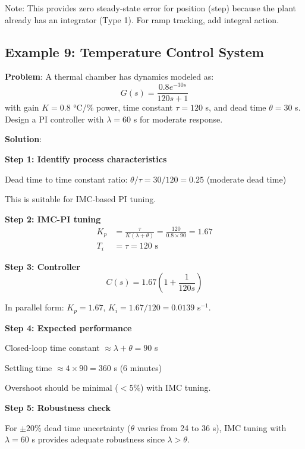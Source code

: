 Note: This provides zero steady-state error for position (step) because the plant already has an integrator (Type 1). For ramp tracking, add integral action.

\subsection{Example 9: Temperature Control System}
\label{subsec:ex_temperature}

\textbf{Problem}: A thermal chamber has dynamics modeled as:
\begin{equation}
G(s) = \frac{0.8e^{-30s}}{120s + 1}
\end{equation}
with gain $K = 0.8$ °C/\% power, time constant $\tau = 120$ s, and dead time $\theta = 30$ s. Design a PI controller with $\lambda = 60$ s for moderate response.

\textbf{Solution}:

\textbf{Step 1: Identify process characteristics}

Dead time to time constant ratio: $\theta/\tau = 30/120 = 0.25$ (moderate dead time)

This is suitable for IMC-based PI tuning.

\textbf{Step 2: IMC-PI tuning}
\begin{align}
K_p &= \frac{\tau}{K(\lambda + \theta)} = \frac{120}{0.8 \times 90} = 1.67 \\
T_i &= \tau = 120 \text{ s}
\end{align}

\textbf{Step 3: Controller}
\begin{equation}
C(s) = 1.67\left(1 + \frac{1}{120s}\right)
\end{equation}

In parallel form: $K_p = 1.67$, $K_i = 1.67/120 = 0.0139$ s$^{-1}$.

\textbf{Step 4: Expected performance}

Closed-loop time constant $\approx \lambda + \theta = 90$ s

Settling time $\approx 4 \times 90 = 360$ s (6 minutes)

Overshoot should be minimal ($<5\%$) with IMC tuning.

\textbf{Step 5: Robustness check}

For $\pm 20\%$ dead time uncertainty ($\theta$ varies from 24 to 36 s), IMC tuning with $\lambda = 60$ s provides adequate robustness since $\lambda > \theta$.

